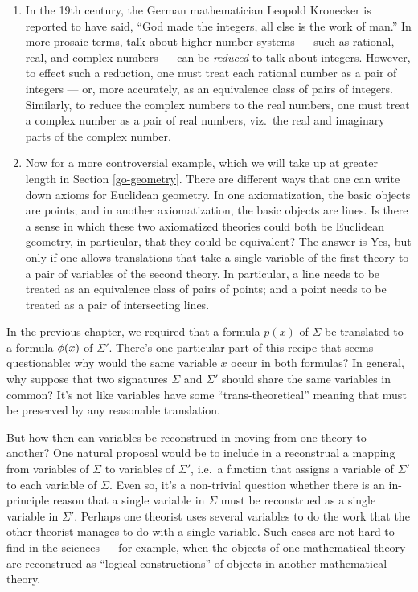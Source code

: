\begin{enumerate}
\item In the 19th century, the German mathematician Leopold Kronecker
  is reported to have said, ``God made the integers, all else is the
  work of man.''  In more prosaic terms, talk about higher number
  systems --- such as rational, real, and complex numbers --- can be
  {\it reduced} to talk about integers.  However, to effect such a
  reduction, one must treat each rational number as a pair of integers
  --- or, more accurately, as an equivalence class of pairs of
  integers.  Similarly, to reduce the complex numbers to the real
  numbers, one must treat a complex number as a pair of real numbers,
  viz.\ the real and imaginary parts of the complex number.
\item Now for a more controversial example, which we will take up at
  greater length in Section \ref{go-geometry}.  There are different
  ways that one can write down axioms for Euclidean geometry.  In one
  axiomatization, the basic objects are points; and in another
  axiomatization, the basic objects are lines.  Is there a sense in
  which these two axiomatized theories could both be Euclidean
  geometry, in particular, that they could be equivalent?  The answer
  is Yes, but only if one allows translations that take a single
  variable of the first theory to a pair of variables of the second
  theory.  In particular, a line needs to be treated as an equivalence
  class of pairs of points; and a point needs to be treated as a pair
  of intersecting lines.
\end{enumerate}

In the previous chapter, we required that a formula $p(x)$ of $\Sigma$
be translated to a formula $\phi (x)$ of $\Sigma '$.  There's one
particular part of this recipe that seems questionable: why would the
same variable $x$ occur in both formulas?  In general, why suppose
that two signatures $\Sigma$ and $\Sigma '$ should share the same
variables in common?  It's not like variables have some
``trans-theoretical'' meaning that must be preserved by any reasonable
translation.

But how then can variables be reconstrued in moving from one theory to
another?  One natural proposal would be to include in a reconstrual a
mapping from variables of $\Sigma$ to variables of $\Sigma '$, i.e.\ a
function that assigns a variable of $\Sigma '$ to each variable of
$\Sigma$.  Even so, it's a non-trivial question whether there is an
in-principle reason that a single variable in $\Sigma$ must be
reconstrued as a single variable in $\Sigma '$.  Perhaps one theorist
uses several variables to do the work that the other theorist manages
to do with a single variable.  Such cases are not hard to find in the
sciences --- for example, when the objects of one mathematical theory
are reconstrued as ``logical constructions'' of objects in another
mathematical theory.

